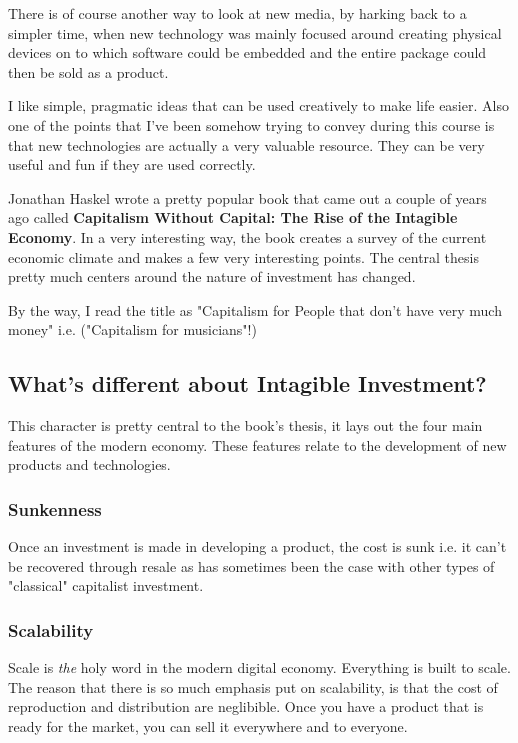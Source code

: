 \documentclass[11pt]{article}
\begin{document}
There is of course another way to look at new media, by harking back to a simpler time, 
when new technology was mainly focused around creating physical devices on to which 
software could be embedded and the entire package could then be sold as a product. 

I like simple, pragmatic ideas that can be used creatively to make life easier. 
Also one of the points that I've been somehow trying to convey during this course
is that new technologies are actually a very valuable resource. They can be very 
useful and fun if they are used correctly. 

Jonathan Haskel wrote a pretty popular book that came out a couple of years ago 
called \textbf{Capitalism Without Capital: The Rise of the Intagible Economy}. In a very 
interesting way, the book creates a survey of the current economic climate and makes 
a few very interesting points. The central thesis pretty much centers around the nature 
of investment has changed.

By the way, I read the title as "Capitalism for People that don't have very much money"
i.e. ("Capitalism for musicians"!)



\subsection{What's different about Intagible Investment?}
\label{sec:orgf854c41}

This character is pretty central to the book's thesis, it lays out the four main features
of the modern economy. These features relate to the development of new products and technologies.

\subsubsection{Sunkenness}
\label{sec:orgb1728eb}
Once an investment is made in developing a product, the cost is sunk i.e. it can't be recovered
through resale as has sometimes been the case with other types of "classical" capitalist investment.

\subsubsection{Scalability}
\label{sec:orgdd40b6b}
Scale is \emph{the} holy word in the modern digital economy. Everything is built to scale. The reason 
that there is so much emphasis put on scalability, is that the cost of reproduction and distribution
are neglibible. Once you have a product that is ready for the market, you can sell it everywhere 
and to everyone.
\end{document}
